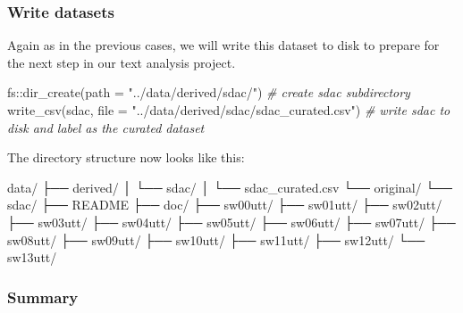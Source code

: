 \documentclass[
]{article}
\newenvironment{Shaded}{\begin{snugshade}}{\end{snugshade}}
\newcommand{\AttributeTok}[1]{\textcolor[rgb]{0.77,0.63,0.00}{#1}}
\newcommand{\CommentTok}[1]{\textcolor[rgb]{0.56,0.35,0.01}{\textit{#1}}}
\newcommand{\ExtensionTok}[1]{#1}
\newcommand{\FunctionTok}[1]{\textcolor[rgb]{0.00,0.00,0.00}{#1}}
\newcommand{\NormalTok}[1]{#1}
\newcommand{\SpecialCharTok}[1]{\textcolor[rgb]{0.00,0.00,0.00}{#1}}
\newcommand{\StringTok}[1]{\textcolor[rgb]{0.31,0.60,0.02}{#1}}
\begin{document}
\hypertarget{write-datasets}{%
\subsubsection{Write datasets}\label{write-datasets}}

Again as in the previous cases, we will write this dataset to disk to prepare for the next step in our text analysis project.

\begin{Shaded}
\begin{Highlighting}[]
\NormalTok{fs}\SpecialCharTok{::}\FunctionTok{dir\_create}\NormalTok{(}\AttributeTok{path =} \StringTok{"../data/derived/sdac/"}\NormalTok{)  }\CommentTok{\# create sdac subdirectory}
\FunctionTok{write\_csv}\NormalTok{(sdac, }\AttributeTok{file =} \StringTok{"../data/derived/sdac/sdac\_curated.csv"}\NormalTok{)  }\CommentTok{\# write sdac to disk and label as the curated dataset}
\end{Highlighting}
\end{Shaded}

The directory structure now looks like this:

\begin{Shaded}
\begin{Highlighting}[]
\ExtensionTok{data/}
\ExtensionTok{├──}\NormalTok{ derived/}
\ExtensionTok{│}\NormalTok{   └── sdac/}
\ExtensionTok{│}\NormalTok{       └── sdac\_curated.csv}
\ExtensionTok{└──}\NormalTok{ original/}
    \ExtensionTok{└──}\NormalTok{ sdac/}
        \ExtensionTok{├──}\NormalTok{ README}
        \ExtensionTok{├──}\NormalTok{ doc/}
        \ExtensionTok{├──}\NormalTok{ sw00utt/}
        \ExtensionTok{├──}\NormalTok{ sw01utt/}
        \ExtensionTok{├──}\NormalTok{ sw02utt/}
        \ExtensionTok{├──}\NormalTok{ sw03utt/}
        \ExtensionTok{├──}\NormalTok{ sw04utt/}
        \ExtensionTok{├──}\NormalTok{ sw05utt/}
        \ExtensionTok{├──}\NormalTok{ sw06utt/}
        \ExtensionTok{├──}\NormalTok{ sw07utt/}
        \ExtensionTok{├──}\NormalTok{ sw08utt/}
        \ExtensionTok{├──}\NormalTok{ sw09utt/}
        \ExtensionTok{├──}\NormalTok{ sw10utt/}
        \ExtensionTok{├──}\NormalTok{ sw11utt/}
        \ExtensionTok{├──}\NormalTok{ sw12utt/}
        \ExtensionTok{└──}\NormalTok{ sw13utt/}
\end{Highlighting}
\end{Shaded}

\hypertarget{summary-7}{%
\subsubsection{Summary}\label{summary-7}}
\end{document}

